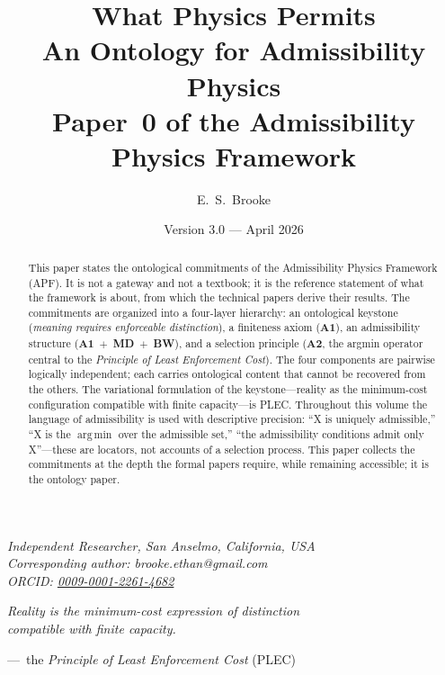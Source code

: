 \documentclass[11pt]{article}
\title{\textbf{What Physics Permits}\\[0.4em]
\large An Ontology for Admissibility Physics\\[0.2em]
\normalsize Paper~0 of the Admissibility Physics Framework}
\author{E.\ S.\ Brooke}
\date{Version 3.0 --- April 2026}
\newcommand{\argmin}{\mathop{\mathrm{arg\,min}}}
\begin{document}
\maketitle

\noindent\textit{Independent Researcher, San Anselmo, California, USA}\\
\textit{Corresponding author: brooke.ethan@gmail.com}\\
\textit{ORCID: \href{https://orcid.org/0009-0001-2261-4682}{0009-0001-2261-4682}}

\vspace{2em}

\begin{center}
\itshape
Reality is the minimum-cost expression of distinction\\
compatible with finite capacity.
\end{center}

\begin{center}
---\ the \emph{Principle of Least Enforcement Cost} (PLEC)
\end{center}

\vspace{1em}

\begin{abstract}
\noindent This paper states the ontological commitments of the Admissibility Physics Framework (APF). It is not a gateway and not a textbook; it is the reference statement of what the framework is about, from which the technical papers derive their results. The commitments are organized into a four-layer hierarchy: an ontological keystone (\emph{meaning requires enforceable distinction}), a finiteness axiom (\textbf{A1}), an admissibility structure (\textbf{A1}~$+$~\textbf{MD}~$+$~\textbf{BW}), and a selection principle (\textbf{A2}, the argmin operator central to the \emph{Principle of Least Enforcement Cost}). The four components are pairwise logically independent; each carries ontological content that cannot be recovered from the others. The variational formulation of the keystone---reality as the minimum-cost configuration compatible with finite capacity---is PLEC. Throughout this volume the language of admissibility is used with descriptive precision: ``X is uniquely admissible,'' ``X is the $\argmin$ over the admissible set,'' ``the admissibility conditions admit only X''---these are locators, not accounts of a selection process. This paper collects the commitments at the depth the formal papers require, while remaining accessible; it is the ontology paper.
\end{abstract}
\end{document}
